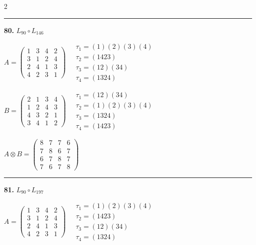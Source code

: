 \begin{multicols}{2}
\vspace{0.3em}
\hrule
\vspace{0.3em}

\noindent\textbf{80.} $L_{90} \circ L_{146}$

$A = \begin{pmatrix} 1 & 3 & 4 & 2 \\ 3 & 1 & 2 & 4 \\ 2 & 4 & 1 & 3 \\ 4 & 2 & 3 & 1 \end{pmatrix} \quad \begin{matrix} \tau_{1}=(1)(2)(3)(4) \\ \tau_{2}=(1 4 2 3) \\ \tau_{3}=(1 2)(3 4) \\ \tau_{4}=(1 3 2 4) \end{matrix}$

$B = \begin{pmatrix} 2 & 1 & 3 & 4 \\ 1 & 2 & 4 & 3 \\ 4 & 3 & 2 & 1 \\ 3 & 4 & 1 & 2 \end{pmatrix} \quad \begin{matrix} \tau_{1}=(1 2)(3 4) \\ \tau_{2}=(1)(2)(3)(4) \\ \tau_{3}=(1 3 2 4) \\ \tau_{4}=(1 4 2 3) \end{matrix}$

$A \otimes B = \begin{pmatrix} 8 & 7 & 7 & 6 \\ 7 & 8 & 6 & 7 \\ 6 & 7 & 8 & 7 \\ 7 & 6 & 7 & 8 \end{pmatrix}$

\vspace{0.3em}
\hrule
\vspace{0.3em}

\noindent\textbf{81.} $L_{90} \circ L_{197}$

$A = \begin{pmatrix} 1 & 3 & 4 & 2 \\ 3 & 1 & 2 & 4 \\ 2 & 4 & 1 & 3 \\ 4 & 2 & 3 & 1 \end{pmatrix} \quad \begin{matrix} \tau_{1}=(1)(2)(3)(4) \\ \tau_{2}=(1 4 2 3) \\ \tau_{3}=(1 2)(3 4) \\ \tau_{4}=(1 3 2 4) \end{matrix}$


\end{multicols}
